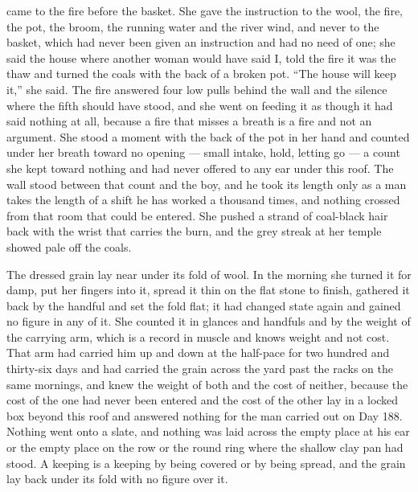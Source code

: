 \scenebreak

 came to the fire before the basket. She gave the instruction to the wool, the fire, the pot, the broom, the running water and the river wind, and never to the basket, which had never been given an instruction and had no need of one; she said the house where another woman would have said I, told the fire it was the thaw and turned the coals with the back of a broken pot. “The house will keep it,” she said. The fire answered four low pulls behind the wall and the silence where the fifth should have stood, and she went on feeding it as though it had said nothing at all, because a fire that misses a breath is a fire and not an argument. She stood a moment with the back of the pot in her hand and counted under her breath toward no opening --- small intake, hold, letting go --- a count she kept toward nothing and had never offered to any ear under this roof. The wall stood between that count and the boy, and he took its length only as a man takes the length of a shift he has worked a thousand times, and nothing crossed from that room that could be entered. She pushed a strand of coal-black hair back with the wrist that carries the burn, and the grey streak at her temple showed pale off the coals.

The dressed grain lay near  under its fold of wool. In the morning she turned it for damp, put her fingers into it, spread it thin on the flat stone to finish, gathered it back by the handful and set the fold flat; it had changed state again and gained no figure in any of it. She counted it in glances and handfuls and by the weight of the carrying arm, which is a record in muscle and knows weight and not cost. That arm had carried him up and down  at the half-pace for two hundred and thirty-six days and had carried the grain across the yard past the racks on the same mornings, and knew the weight of both and the cost of neither, because the cost of the one had never been entered and the cost of the other lay in a locked box beyond this roof and answered nothing for the man carried out on Day 188. Nothing went onto a slate, and nothing was laid across the empty place at his ear or the empty place on the row or the round ring where the shallow clay pan had stood. A keeping is a keeping by being covered or by being spread, and the grain lay back under its fold with no figure over it.

